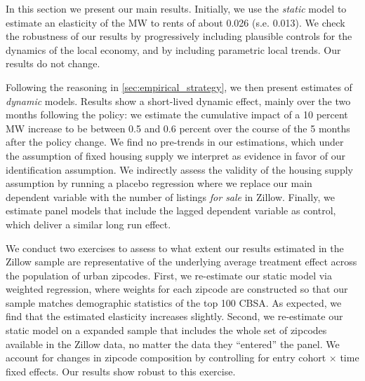 
In this section we present our main results. Initially, we use the \textit{static} model
to estimate an elasticity of the MW to rents of about 0.026 (s.e. 0.013). We check the
robustness of our results by progressively including plausible controls for the dynamics 
of the local economy, and by including parametric local trends. Our results do not change.

Following the reasoning in \autoref{sec:empirical_strategy}, we then present estimates of 
\textit{dynamic} models. Results show a short-lived dynamic effect, mainly over the two
months following the policy: we estimate the cumulative impact of a 10 percent MW increase 
to be between 0.5 and 0.6 percent over the course of the 5 months after the policy change. 
We find no pre-trends in our estimations, which under the assumption of fixed housing supply 
we interpret as evidence in favor of our identification assumption. We indirectly assess the 
validity of the housing supply assumption by running a placebo regression where we replace 
our main dependent variable with the number of listings \textit{for sale} in Zillow. 
Finally, we estimate panel models that include the lagged dependent variable as control,
which deliver a similar long run effect.






We conduct two exercises to assess to what extent our results estimated in the Zillow sample 
are representative of the underlying average treatment effect across the population of urban
zipcodes. First, we re-estimate our static model via weighted regression, where weights for 
each zipcode are constructed so that our sample matches demographic statistics of the top 100 
CBSA.  As expected, we find that the estimated elasticity increases slightly. Second, we 
re-estimate our static model on a expanded sample that includes the whole set of zipcodes 
available in the Zillow data, no matter the data they ``entered'' the panel. We account for 
changes in zipcode composition by controlling for entry cohort $\times$ time fixed effects. 
Our results show robust to this exercise.

